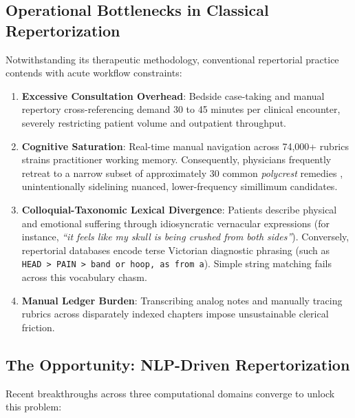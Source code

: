 \subsection{Operational Bottlenecks in Classical Repertorization}

Notwithstanding its therapeutic methodology, conventional repertorial practice contends with acute workflow constraints:

\begin{enumerate}
  \item \textbf{Excessive Consultation Overhead}: Bedside case-taking and manual repertory cross-referencing demand 30 to 45 minutes per clinical encounter, severely restricting patient volume and outpatient throughput.
  \item \textbf{Cognitive Saturation}: Real-time manual navigation across 74,000+ rubrics strains practitioner working memory. Consequently, physicians frequently retreat to a narrow subset of approximately 30 common \textit{polycrest} remedies \cite{sherr2002}, unintentionally sidelining nuanced, lower-frequency simillimum candidates.
  \item \textbf{Colloquial-Taxonomic Lexical Divergence}: Patients describe physical and emotional suffering through idiosyncratic vernacular expressions (for instance, \textit{``it feels like my skull is being crushed from both sides''}). Conversely, repertorial databases encode terse Victorian diagnostic phrasing (such as \texttt{HEAD > PAIN > band or hoop, as from a}). Simple string matching fails across this vocabulary chasm.
  \item \textbf{Manual Ledger Burden}: Transcribing analog notes and manually tracing rubrics across disparately indexed chapters impose unsustainable clerical friction.
\end{enumerate}

\subsection{The Opportunity: NLP-Driven Repertorization}

Recent breakthroughs across three computational domains converge to unlock this problem:

